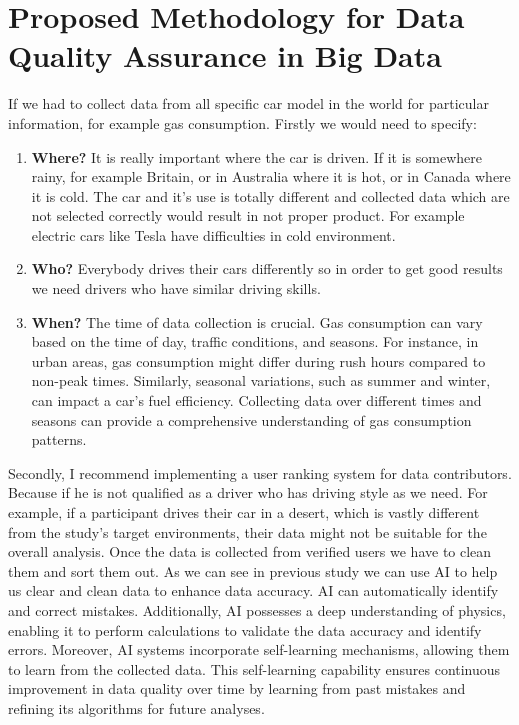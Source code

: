 \documentclass[10pt,a4paper]{article}
\begin{document}
\section{Proposed Methodology for Data Quality Assurance in Big Data}
If we had to collect data from all specific car model in the world for particular information, for example gas consumption.
Firstly we would need to specify:
\begin{enumerate}
    \item \textbf{Where?} It is really important where the car is driven. If it is somewhere rainy, for example Britain, or in Australia where it is hot, or in Canada where it is cold. The car and it's use is totally different and collected data which are not selected correctly would result in not proper product. For example electric cars like Tesla have difficulties in cold environment.
    \item \textbf{Who?} Everybody drives their cars differently so in order to get good results we need drivers who have similar driving skills.
    \item \textbf{When?} The time of data collection is crucial. Gas consumption can vary based on the time of day, traffic conditions, and seasons. For instance, in urban areas, gas consumption might differ during rush hours compared to non-peak times. Similarly, seasonal variations, such as summer and winter, can impact a car's fuel efficiency. Collecting data over different times and seasons can provide a comprehensive understanding of gas consumption patterns.
\end{enumerate}
Secondly, I recommend implementing a user ranking system for data contributors. Because if he is not qualified as a driver who has driving style as we need. For example, if a participant drives their car in a desert, which is vastly different from the study's target environments, their data might not be suitable for the overall analysis.\cite{8605945}
Once the data is collected from verified users we have to clean them and sort them out.
As we can see in previous study we can use AI to help us clear and clean data to enhance data accuracy. AI can automatically identify and correct mistakes. Additionally, AI possesses a deep understanding of physics, enabling it to perform calculations to validate the data accuracy and identify errors. Moreover, AI systems incorporate self-learning mechanisms, allowing them to learn from the collected data. This self-learning capability ensures continuous improvement in data quality over time by learning from past mistakes and refining its algorithms for future analyses.\cite{6949519}


\end{document}
